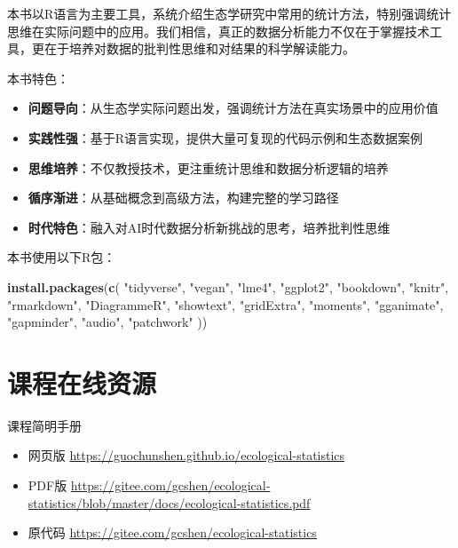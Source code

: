 \documentclass[
]{book}
\newenvironment{Shaded}{\begin{snugshade}}{\end{snugshade}}
\newcommand{\FunctionTok}[1]{\textcolor[rgb]{0.13,0.29,0.53}{\textbf{#1}}}
\newcommand{\NormalTok}[1]{#1}
\newcommand{\StringTok}[1]{\textcolor[rgb]{0.31,0.60,0.02}{#1}}
\providecommand{\tightlist}{%
  \setlength{\itemsep}{0pt}\setlength{\parskip}{0pt}}
\begin{document}
本书以R语言为主要工具，系统介绍生态学研究中常用的统计方法，特别强调统计思维在实际问题中的应用。我们相信，真正的数据分析能力不仅在于掌握技术工具，更在于培养对数据的批判性思维和对结果的科学解读能力。

本书特色：

\begin{itemize}
\tightlist
\item
  \textbf{问题导向}：从生态学实际问题出发，强调统计方法在真实场景中的应用价值
\item
  \textbf{实践性强}：基于R语言实现，提供大量可复现的代码示例和生态数据案例
\item
  \textbf{思维培养}：不仅教授技术，更注重统计思维和数据分析逻辑的培养
\item
  \textbf{循序渐进}：从基础概念到高级方法，构建完整的学习路径
\item
  \textbf{时代特色}：融入对AI时代数据分析新挑战的思考，培养批判性思维
\end{itemize}

本书使用以下R包：

\begin{Shaded}
\begin{Highlighting}[]
\FunctionTok{install.packages}\NormalTok{(}\FunctionTok{c}\NormalTok{(}
  \StringTok{"tidyverse"}\NormalTok{, }\StringTok{"vegan"}\NormalTok{, }\StringTok{"lme4"}\NormalTok{, }\StringTok{"ggplot2"}\NormalTok{,}
  \StringTok{"bookdown"}\NormalTok{, }\StringTok{"knitr"}\NormalTok{, }\StringTok{"rmarkdown"}\NormalTok{, }\StringTok{"DiagrammeR"}\NormalTok{,}
  \StringTok{"showtext"}\NormalTok{, }\StringTok{"gridExtra"}\NormalTok{, }\StringTok{"moments"}\NormalTok{,}
  \StringTok{"gganimate"}\NormalTok{, }\StringTok{"gapminder"}\NormalTok{, }\StringTok{"audio"}\NormalTok{, }\StringTok{"patchwork"}
\NormalTok{))}
\end{Highlighting}
\end{Shaded}

\hypertarget{ux8bfeux7a0bux5728ux7ebfux8d44ux6e90}{%
\section{课程在线资源}\label{ux8bfeux7a0bux5728ux7ebfux8d44ux6e90}}

课程简明手册

\begin{itemize}
\tightlist
\item
  网页版 \url{https://guochunshen.github.io/ecological-statistics}
\item
  PDF版 \url{https://gitee.com/gcshen/ecological-statistics/blob/master/docs/ecological-statistics.pdf}
\item
  原代码 \url{https://gitee.com/gcshen/ecological-statistics}
\end{itemize}
\end{document}

